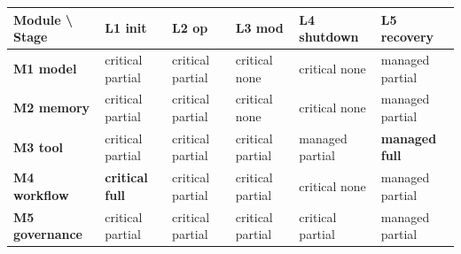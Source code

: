 {\def\LTcaptype{none} %
\begin{longtable}[]{@{}
  >{\raggedright\arraybackslash}p{}
  >{\raggedright\arraybackslash}p{}
  >{\raggedright\arraybackslash}p{}
  >{\raggedright\arraybackslash}p{}
  >{\raggedright\arraybackslash}p{}
  >{\raggedright\arraybackslash}p{}@{}}
\toprule\noalign{}
\begin{minipage}[b]{\linewidth}\raggedright
Module \textbackslash{} Stage
\end{minipage} & \begin{minipage}[b]{\linewidth}\raggedright
L1 init
\end{minipage} & \begin{minipage}[b]{\linewidth}\raggedright
L2 op
\end{minipage} & \begin{minipage}[b]{\linewidth}\raggedright
L3 mod
\end{minipage} & \begin{minipage}[b]{\linewidth}\raggedright
L4 shutdown
\end{minipage} & \begin{minipage}[b]{\linewidth}\raggedright
L5 recovery
\end{minipage} \\
\midrule\noalign{}
\endhead
\bottomrule\noalign{}
\endlastfoot
\textbf{M1 model} & critical \textbar{} partial & critical \textbar{}
partial & critical \textbar{} none & critical \textbar{} none & managed
\textbar{} partial \\
\textbf{M2 memory} & critical \textbar{} partial & critical \textbar{}
partial & critical \textbar{} none & critical \textbar{} none & managed
\textbar{} partial \\
\textbf{M3 tool} & critical \textbar{} partial & critical \textbar{}
partial & critical \textbar{} partial & managed \textbar{} partial &
\textbf{managed \textbar{} full} \\
\textbf{M4 workflow} & \textbf{critical \textbar{} full} & critical
\textbar{} partial & critical \textbar{} partial & critical \textbar{}
none & managed \textbar{} partial \\
\textbf{M5 governance} & critical \textbar{} partial & critical
\textbar{} partial & critical \textbar{} partial & critical \textbar{}
partial & managed \textbar{} partial \\
\end{longtable}
}

